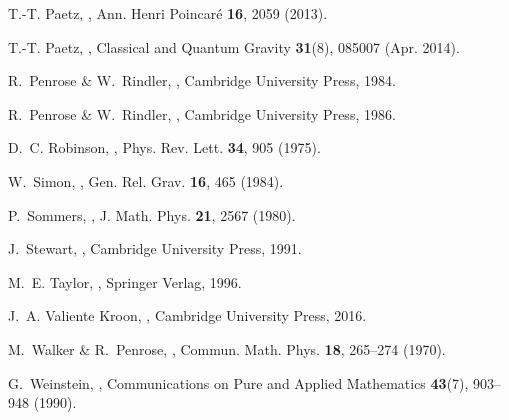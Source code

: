 \documentclass[10pt,a4paper]{article}
\theoremstyle{plain}
\begin{document}
\begin{thebibliography}{10}
T.-T. Paetz,
,
\newblock Ann. Henri Poincar\'{e} {\bf 16}, 2059 (2013).

T.-T. {Paetz},
,
\newblock Classical and Quantum Gravity {\bf 31}(8), 085007 (Apr. 2014).

R.~Penrose \& W.~Rindler,
,
\newblock Cambridge University Press, 1984.

R.~Penrose \& W.~Rindler,
,
\newblock Cambridge University Press, 1986.

D.~C. Robinson,
,
\newblock Phys. Rev. Lett. {\bf 34}, 905 (1975).

W.~Simon,
,
\newblock Gen. Rel. Grav. {\bf 16}, 465 (1984).

P.~Sommers,
,
\newblock J. Math. Phys. {\bf 21}, 2567 (1980).

J.~Stewart,
,
\newblock Cambridge University Press, 1991.

M.~E. Taylor,
,
\newblock Springer Verlag, 1996.

J.~A. {Valiente Kroon},
,
\newblock Cambridge University Press, 2016.

M.~Walker \& R.~Penrose,
,
\newblock Commun. Math. Phys. {\bf 18}, 265--274 (1970).

G.~Weinstein,
,
\newblock Communications on Pure and Applied Mathematics {\bf 43}(7), 903--948
  (1990).

\end{thebibliography}
\end{document}
